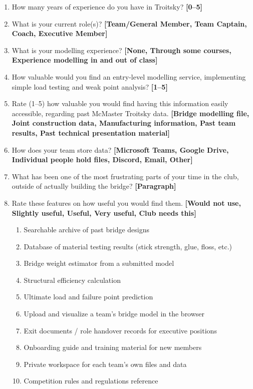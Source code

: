 \documentclass[12pt, titlepage]{article}
\begin{document}
\begin{enumerate}
  \item How many years of experience do you have in Troitsky? \textbf{[0--5]}
  \item What is your current role(s)? \textbf{[Team/General Member, Team Captain,
    Coach, Executive Member]}
  \item What is your modelling experience? \textbf{[None, Through some courses,
    Experience modelling in and out of class]}
  \item How valuable would you find an entry-level modelling service, implementing
    simple load testing and weak point analysis? \textbf{[1--5]}
  \item Rate (1--5) how valuable you would find having this information easily
    accessible, regarding past McMaster Troitsky data. \textbf{[Bridge modelling
    file, Joint construction data, Manufacturing information, Past team results,
    Past technical presentation material]}
  \item How does your team store data? \textbf{[Microsoft Teams, Google Drive,
    Individual people hold files, Discord, Email, Other]}
  \item What has been one of the most frustrating parts of your time in the club,
    outside of actually building the bridge? \textbf{[Paragraph]}
  \item Rate these features on how useful you would find them. \textbf{[Would not
    use, Slightly useful, Useful, Very useful, Club needs this]}
  \begin{enumerate}
    \item[A.] Searchable archive of past bridge designs
    \item[B.] Database of material testing results (stick strength, glue, floss, etc.)
    \item[C.] Bridge weight estimator from a submitted model
    \item[D.] Structural efficiency calculation
    \item[E.] Ultimate load and failure point prediction
    \item[F.] Upload and visualize a team's bridge model in the browser
    \item[G.] Exit documents / role handover records for executive positions
    \item[H.] Onboarding guide and training material for new members
    \item[I.] Private workspace for each team's own files and data
    \item[J.] Competition rules and regulations reference

\end{enumerate}
\end{enumerate}
\end{document}
